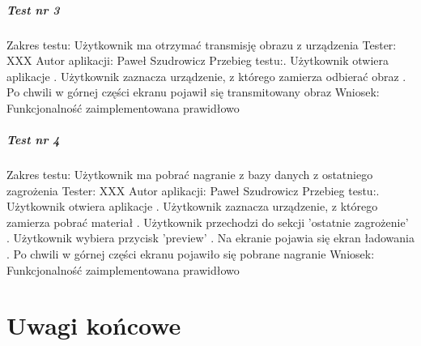  \paragraph{Test nr 3}
Zakres testu:\newline
Użytkownik ma otrzymać transmisję obrazu z urządzenia\newline
Tester: XXX \newline
Autor aplikacji: Paweł Szudrowicz \newline
Przebieg testu:. Użytkownik otwiera aplikacje . Użytkownik zaznacza urządzenie, z którego zamierza odbierać obraz . Po chwili w górnej części ekranu pojawił się transmitowany obraz\newline
Wniosek:\newline
Funkcjonalność zaimplementowana prawidłowo\newline
\newline

 \paragraph{Test nr 4}
Zakres testu:\newline
Użytkownik ma pobrać nagranie z bazy danych z ostatniego zagrożenia\newline
Tester: XXX \newline
Autor aplikacji: Paweł Szudrowicz \newline
Przebieg testu:. Użytkownik otwiera aplikacje . Użytkownik zaznacza urządzenie, z którego zamierza pobrać materiał . Użytkownik przechodzi do sekcji 'ostatnie zagrożenie' . Użytkownik wybiera przycisk 'preview' . Na ekranie pojawia się ekran ładowania . Po chwili w górnej części ekranu pojawiło się pobrane nagranie \newline
Wniosek:\newline
Funkcjonalność zaimplementowana prawidłowo\newline


\chapter{Uwagi końcowe}

